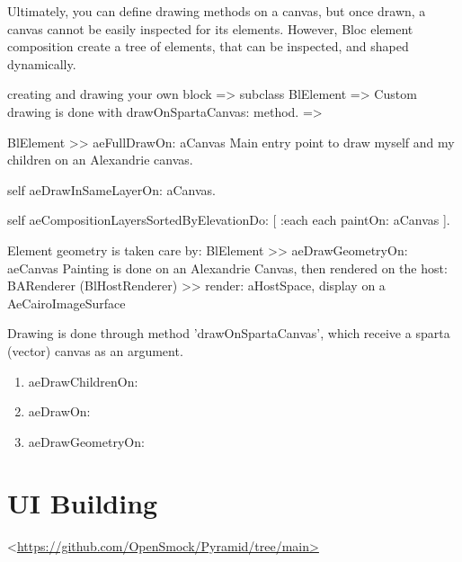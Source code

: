 \documentclass[10pt,twoside,english]{_support/latex/sbabook/sbabook}
\begin{document}
Ultimately, you can define
drawing methods on a canvas, but once drawn, a canvas cannot be easily inspected
for its elements. However, Bloc element composition create a tree of elements,
that can be inspected, and shaped dynamically.

creating and drawing your own block
=\textgreater{} subclass BlElement
=\textgreater{} Custom drawing is done with drawOnSpartaCanvas: method.
=\textgreater{}

BlElement \textgreater{}\textgreater{} aeFullDrawOn: aCanvas
Main entry point to draw myself and my children on an Alexandrie canvas.

self aeDrawInSameLayerOn: aCanvas.

self aeCompositionLayersSortedByElevationDo: {[} :each \textbar{} each paintOn: aCanvas {]}.

Element geometry is taken care by:
BlElement \textgreater{}\textgreater{} aeDrawGeometryOn: aeCanvas
Painting is done on an Alexandrie Canvas, then rendered on the host:
BARenderer (BlHostRenderer) \textgreater{}\textgreater{} render: aHostSpace, display on a AeCairoImageSurface

Drawing is done through method 'drawOnSpartaCanvas', which receive a sparta
(vector) canvas as an argument.

\begin{enumerate}
    \item aeDrawChildrenOn:
    \item aeDrawOn:
    \item aeDrawGeometryOn:
\end{enumerate}

\chapter{UI Building}
\textless{}\href{https://github.com/OpenSmock/Pyramid/tree/main>}{https://github.com/OpenSmock/Pyramid/tree/main\textgreater{}}






\backmatter

\end{document}
